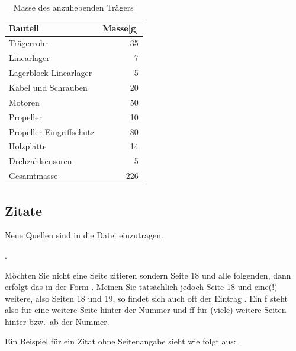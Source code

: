 \begin{table}[H]
  \caption{Masse des anzuhebenden Trägers%
           \label{table:massen_rahmen}}
  \medskip
  \begin{center}
    \begin{tabular}{|l|r|}
      \hline
      Bauteil                  & Masse[g] \\
      \hline
      Trägerrohr               &       35 \\
      Linearlager              &        7 \\
      Lagerblock Linearlager   &        5 \\
      Kabel und Schrauben      &       20 \\
      Motoren                  &       50 \\
      Propeller                &       10 \\
      Propeller Eingriffschutz &       80 \\
      Holzplatte               &       14 \\
      Drehzahlsensoren         &        5 \\
      \hline
      Gesamtmasse              &      226 \\
      \hline
    \end{tabular}
  \end{center}
\end{table}
    
\subsection{Zitate%
            \label{sec:Zitate}}

Neue Quellen sind in die Datei  einzutragen.
   
\grqq{}
         \citep[S. 25]{boris2009}.
         

Möchten Sie nicht eine Seite zitieren sondern Seite 18 und alle folgenden, dann erfolgt das in der Form 
\citep[S. 18ff]{boris2009}.
Meinen Sie tatsächlich jedoch Seite 18 und eine(!) weitere, also Seiten 18 und 19, so findet sich auch oft der Eintrag 
\citep[S. 18f]{boris2009}.
Ein \glqq{}f\grqq{} steht also für eine weitere Seite hinter der Nummer und \glqq{}ff\grqq{} für (viele) weitere Seiten hinter bzw.~ab der Nummer. 

Ein Beispiel für ein Zitat ohne Seitenangabe sieht wie folgt aus: 
\citep{kleinantriebe2011}. 
    
